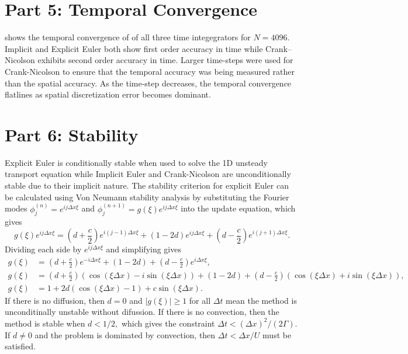 \documentclass[reqno, 12pt]{amsart}
\begin{document}
    \section*{Part 5: Temporal Convergence}
    \noindent {} shows the temporal convergence of of all three time integegrators for $N = 4096$.
    Implicit and Explicit Euler both show first order accuracy in time while Crank--Nicolson exhibits second order accuracy in time.
    Larger time-steps were used for Crank-Nicolson to ensure that the temporal accuracy was being measured rather than the spatial accuracy.
    As the time-step decreases, the temporal convergence flatlines as spatial discretization error becomes dominant.

    \section*{Part 6: Stability}
    \noindent Explicit Euler is conditionally stable when used to solve the 1D unsteady transport equation while Implicit Euler and Crank-Nicolson are unconditionally stable due to their implicit nature.
The stability criterion for explicit Euler can be calculated using Von Neumann stability analysis by substituting the Fourier modes $\phi_j^{(n)} = e^{ij\Delta x\xi}$ and $\phi_j^{(n+1)} = g(\xi)e^{ij\Delta x\xi}$ into the update equation, which gives
    \begin{equation*}
        g(\xi)e^{ij\Delta x\xi} = \left(d + \frac{c}{2}\right)e^{i(j-1)\Delta x\xi} + \left(1 - 2d\right)e^{ij\Delta x\xi} + \left(d - \frac{c}{2}\right)e^{i(j+1)\Delta x\xi}.
    \end{equation*}
    Dividing each side by $e^{ij\Delta x\xi}$ and simplifying gives
    \begin{align*}
        g(\xi) &= \left(d + \frac{c}{2}\right)e^{-i\Delta x\xi} + \left(1 - 2d\right) + \left(d - \frac{c}{2}\right)e^{i\Delta x\xi}, \\
        g(\xi) &= \left(d + \frac{c}{2}\right)\left(\cos(\xi\Delta x) - i\sin(\xi\Delta x)\right) + \left(1 - 2d\right) + \left(d - \frac{c}{2}\right)\left(\cos(\xi\Delta x) + i\sin(\xi\Delta x)\right), \\
        g(\xi) &= 1 + 2d\left(\cos(\xi\Delta x) - 1\right) + c\sin(\xi\Delta x).
    \end{align*}
    If there is no diffusion, then $d = 0$ and $|g(\xi)| \ge 1$ for all $\Delta t$ mean the method is unconditinally unstable without difussion.
    If there is no convection, then the method is stable when $d < 1/2,$ which gives the constraint $\Delta t < (\Delta x)^2/(2\Gamma)$.
    If $d \ne 0$ and the problem is dominated by convection, then $\Delta t < \Delta x/U$ must be satisfied.
\end{document}
